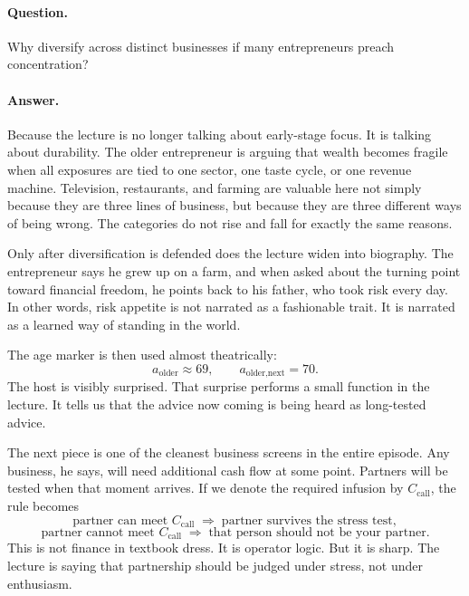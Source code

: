 \paragraph{Question.} Why diversify across distinct businesses if many entrepreneurs preach concentration?

\paragraph{Answer.} Because the lecture is no longer talking about early-stage focus. It is talking about durability. The older entrepreneur is arguing that wealth becomes fragile when all exposures are tied to one sector, one taste cycle, or one revenue machine. Television, restaurants, and farming are valuable here not simply because they are three lines of business, but because they are three different ways of being wrong. The categories do not rise and fall for exactly the same reasons.

Only after diversification is defended does the lecture widen into biography. The entrepreneur says he grew up on a farm, and when asked about the turning point toward financial freedom, he points back to his father, who took risk every day. In other words, risk appetite is not narrated as a fashionable trait. It is narrated as a learned way of standing in the world.

The age marker is then used almost theatrically:
\begin{equation}
a_{\text{older}} \approx 69,\qquad
a_{\text{older,next}} = 70.
\end{equation}
The host is visibly surprised. That surprise performs a small function in the lecture. It tells us that the advice now coming is being heard as long-tested advice.

The next piece is one of the cleanest business screens in the entire episode. Any business, he says, will need additional cash flow at some point. Partners will be tested when that moment arrives. If we denote the required infusion by \(C_{\text{call}}\), the rule becomes
\begin{equation}
\text{partner can meet } C_{\text{call}}
\;\Rightarrow\;
\text{partner survives the stress test},
\end{equation}
\begin{equation}
\text{partner cannot meet } C_{\text{call}}
\;\Rightarrow\;
\text{that person should not be your partner}.
\end{equation}
This is not finance in textbook dress. It is operator logic. But it is sharp. The lecture is saying that partnership should be judged under stress, not under enthusiasm.

